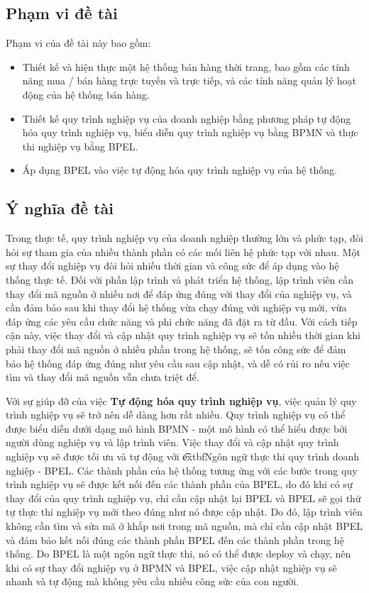 \subsection{Phạm vi đề tài}
\par Phạm vi của đề tài này bao gồm:
\begin{itemize}
	\item Thiết kế và hiện thực một hệ thống bán hàng thời trang, bao gồm các tính năng mua / bán hàng trực tuyến và trực tiếp, và các tính năng quản lý hoạt động của hệ thống bán hàng.
	\item Thiết kế quy trình nghiệp vụ của doanh nghiệp bằng phương pháp tự động hóa quy trình nghiệp vụ, biểu diễn quy trình nghiệp vụ bằng BPMN và thực thi nghiệp vụ bằng BPEL.
	\item Áp dụng BPEL vào việc tự động hóa quy trình nghiệp vụ của hệ thống.
\end{itemize}

\subsection{Ý nghĩa đề tài}
\hspace{0.5cm} Trong thực tế, quy trình nghiệp vụ của doanh nghiệp thường lớn và phức tạp, đòi hỏi sự tham gia của nhiều thành phần có các mối liên hệ phức tạp với nhau. Một sự thay đổi nghiệp vụ đòi hỏi nhiều thời gian và công sức để áp dụng vào hệ thống thực tế. Đối với phần lập trình và phát triển hệ thống, lập trình viên cần thay đổi mã nguồn ở nhiều nơi để đáp ứng đúng với thay đổi của nghiệp vụ, và cần đảm bảo sau khi thay đổi hệ thống vừa chạy đúng với nghiệp vụ mới, vừa đáp ứng các yêu cầu chức năng và phi chức năng đã đặt ra từ đầu. Với cách tiếp cận này, việc thay đổi và cập nhật quy trình nghiệp vụ sẽ tốn nhiều thời gian khi phải thay đổi mã nguồn ở nhiều phần trong hệ thống, sẽ tốn công sức để đảm bảo hệ thống đáp ứng đúng như yêu cầu sau cập nhật, và dễ có rủi ro nếu việc tìm và thay đổi mã nguồn vẫn chưa triệt để.

\par Với sự giúp đỡ của việc \textbf{Tự động hóa quy trình nghiệp vụ}, việc quản lý quy trình nghiệp vụ sẽ trở nên dễ dàng hơn rất nhiều. Quy trình nghiệp vụ có thể được biểu diễn dưới dạng mô hình BPMN - một mô hình có thể hiểu được bởi người dùng nghiệp vụ và lập trình viên. Việc thay đổi và cập nhật quy trình nghiệp vụ sẽ được tối ưu và tự động với \t
extbf{Ngôn ngữ thực thi quy trình doanh nghiệp - BPEL}. Các thành phần của hệ thống tương ứng với các bước trong quy trình nghiệp vụ sẽ được kết nối đến các thành phần của BPEL, do đó khi có sự thay đổi của quy trình nghiệp vụ, chỉ cần cập nhật lại BPEL và BPEL sẽ gọi thứ tự thực thi nghiệp vụ mới theo đúng như nó được cập nhật. Do đó, lập trình viên không cần tìm và sửa mã ở khắp nơi trong mã nguồn, mà chỉ cần cập nhật BPEL và đảm bảo kết nối đúng các thành phần BPEL đến các thành phần trong hệ thống. Do BPEL là một ngôn ngữ thực thi, nó có thể được deploy và chạy, nên khi có sự thay đổi nghiệp vụ ở BPMN và BPEL, việc cập nhật nghiệp vụ sẽ nhanh và tự động mà không yêu cầu nhiều công sức của con người.

